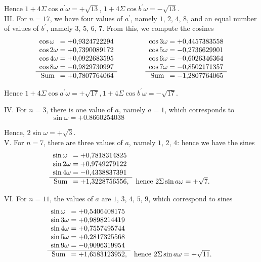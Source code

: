 \documentclass[twoside,12pt]{memoir}
\begin{document}
Hence \(1+4 \Sigma \cos a^{\prime} \omega=+\sqrt{13}\), \(1+4 \Sigma \cos b^{\prime} \omega=-\sqrt{13}\).\\

III. For \(n=17\), we have four values of \(a^\prime\), namely \(1\), \(2\), \(4\), \(8\), and an equal number of values of \(b^\prime\), namely \(3\), \(5\), \(6\), \(7\). From this, we compute the cosines
\[\begin{array}{r}
\cos \omega\phantom{1}  =+0{,}9324722294 \\
\cos 2 \omega  =+0{,}7390089172 \\
\cos 4 \omega  =+0{,}0922683595 \\
\cos 8 \omega  =-0{,}9829730997 \\
\hline \text{Sum\phantom{a}} =+0{,}7807764064 
\end{array}
\qquad \qquad
\begin{array}{r}
\cos 3 \omega  =+0{,}4457383558 \\
\cos 5 \omega  =-0{,}2736629901 \\
\cos 6 \omega  =-0{,}6026346364 \\
\cos 7 \omega  =-0{,}8502171357 \\
\hline \text{Sum\phantom{a}} =-1{,}2807764065
\end{array}\]

Hence \(1+4 \Sigma \cos a^{\prime} \omega=+\sqrt{17},1+4 \Sigma \cos b^{\prime} \omega=-\sqrt{17}\).\\\pagebreak%

IV. For \(n=3\), there is one value of \(a\), namely \(a=1\), which corresponds to 
\[\sin \omega=+0.8660254038 \quad\quad \phantom{\sin \omega=+0.8660254038}\]
 
Hence, \(2 \sin \omega=+\sqrt{3}\).\\

V. For \(n=7\), there are three values of \(a\), namely \(1\), \(2\), \(4\): hence we have the sines
\[\begin{array}{rl}
 \sin \omega\phantom{1} =+0{,}7818314825 \phantom{,}&\\
\sin 2 \omega  =+0{,}9749279122 \phantom{,}&\\
\sin 4 \omega  =-0{,}4338837391 \phantom{,}&\\
\cline{1-1} \text{Sum\phantom{a}}  =+1{,}3228756556,& \text{hence } 2 \Sigma \sin a \omega=+\sqrt{7}.
\end{array}\]

VI. For \(n=11\), the values of \(a\) are \(1\), \(3\), \(4\), \(5\), \(9\), which correspond to sines
\[\begin{array}{rl}
\sin \omega\phantom{1}  =+0{,}5406408175 \phantom{,}&\\
\sin 3 \omega  =+0{,}9898214419 \phantom{,}&\\
\sin 4 \omega  =+0{,}7557495744 \phantom{,}&\\
\sin 5 \omega  =+0{,}2817325568 \phantom{,}&\\
\sin 9 \omega  =-0{,}9096319954 \phantom{,}&\\
\cline{1-1} \text{Sum\phantom{a}} =+1{,}6583123952,& \text{hence } 2 \Sigma \sin a \omega=+\sqrt{11}.
\end{array}\]
\end{document}
